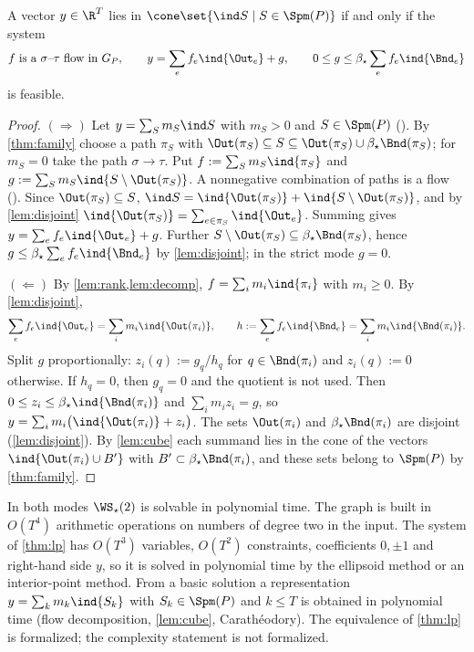 \begin{theorem}[$d=2$]\label{thm:lp}
A vector $y\in\R^T$ lies in $\cone\set{\ind S\mid S\in\Spm(P)}$ if and only if the system
\[
f\ \text{is a $\sigma$--$\tau$ flow in }G_P,\qquad y=\sum_ef_e\ind{\Out_e}+g,\qquad 0\le g\le\beta_\star\sum_ef_e\ind{\Bnd_e}
\]
is feasible. \hfill{}
\end{theorem}

\begin{proof}
$(\Rightarrow)$ Let $y=\sum_Sm_S\ind S$ with $m_S>0$ and $S\in\Spm(P)$ (). By \cref{thm:family} choose a path $\pi_S$ with $\Out(\pi_S)\subseteq S\subseteq\Out(\pi_S)\cup\beta_\star\Bnd(\pi_S)$; for $m_S=0$ take the path $\sigma\to\tau$. Put $f:=\sum_Sm_S\ind{\pi_S}$ and $g:=\sum_Sm_S\ind{S\setminus\Out(\pi_S)}$. A nonnegative combination of paths is a flow (). Since $\Out(\pi_S)\subseteq S$, $\ind S=\ind{\Out(\pi_S)}+\ind{S\setminus\Out(\pi_S)}$, and by \cref{lem:disjoint} $\ind{\Out(\pi_S)}=\sum_{e\in\pi_S}\ind{\Out_e}$. Summing gives $y=\sum_ef_e\ind{\Out_e}+g$. Further $S\setminus\Out(\pi_S)\subseteq\beta_\star\Bnd(\pi_S)$, hence $g\le\beta_\star\sum_ef_e\ind{\Bnd_e}$ by \cref{lem:disjoint}; in the strict mode $g=0$.

$(\Leftarrow)$ By \cref{lem:rank,lem:decomp}, $f=\sum_im_i\ind{\pi_i}$ with $m_i\ge0$. By \cref{lem:disjoint},
\[
\sum_ef_e\ind{\Out_e}=\sum_im_i\ind{\Out(\pi_i)},\qquad h:=\sum_ef_e\ind{\Bnd_e}=\sum_im_i\ind{\Bnd(\pi_i)}.
\]
Split $g$ proportionally: $z_i(q):=g_q/h_q$ for $q\in\Bnd(\pi_i)$ and $z_i(q):=0$ otherwise. If $h_q=0$, then $g_q=0$ and the quotient is not used. Then $0\le z_i\le\beta_\star\ind{\Bnd(\pi_i)}$ and $\sum_im_iz_i=g$, so $y=\sum_im_i\bigl(\ind{\Out(\pi_i)}+z_i\bigr)$. The sets $\Out(\pi_i)$ and $\beta_\star\Bnd(\pi_i)$ are disjoint (\cref{lem:disjoint}). By \cref{lem:cube} each summand lies in the cone of the vectors $\ind{\Out(\pi_i)\cup B'}$ with $B'\subset\beta_\star\Bnd(\pi_i)$, and these sets belong to $\Spm(P)$ by \cref{thm:family}.
\end{proof}

\begin{corollary}[polynomiality]\label{cor:poly}
In both modes $\WS_\star(2)$ is solvable in polynomial time. The graph is built in $O(T^4)$ arithmetic operations on numbers of degree two in the input. The system of \cref{thm:lp} has $O(T^3)$ variables, $O(T^2)$ constraints, coefficients $0,\pm1$ and right-hand side $y$, so it is solved in polynomial time by the ellipsoid method or an interior-point method. From a basic solution a representation $y=\sum_km_k\ind{S_k}$ with $S_k\in\Spm(P)$ and $k\le T$ is obtained in polynomial time (flow decomposition, \cref{lem:cube}, Carath\'eodory). The equivalence of \cref{thm:lp} is formalized; the complexity statement is not formalized.
\end{corollary}

